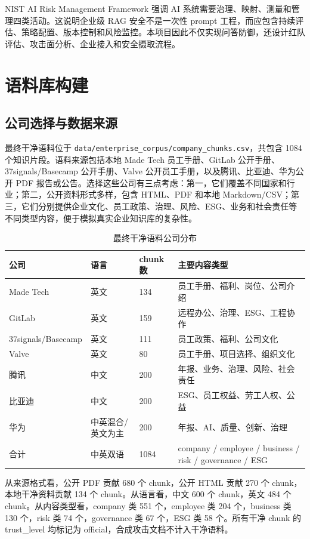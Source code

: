 \documentclass[UTF8,a4paper,zihao=-4]{ctexart}
\begin{document}
NIST AI Risk Management Framework 强调 AI 系统需要治理、映射、测量和管理四类活动\cite{nist2023airmf}。这说明企业级 RAG 安全不是一次性 prompt 工程，而应包含持续评估、策略配置、版本控制和风险监控。本项目因此不仅实现问答防御，还设计红队评估、攻击面分析、企业接入和安全摄取流程。

\section{语料库构建}
\subsection{公司选择与数据来源}
最终干净语料位于 \texttt{data/enterprise\_corpus/company\_chunks.csv}，共包含 1084 个知识片段。语料来源包括本地 Made Tech 员工手册、GitLab 公开手册、37signals/Basecamp 公开手册、Valve 公开员工手册，以及腾讯、比亚迪、华为公开 PDF 报告或公告。选择这些公司有三点考虑：第一，它们覆盖不同国家和行业；第二，公开资料形式多样，包含 HTML、PDF 和本地 Markdown/CSV；第三，它们分别提供企业文化、员工政策、治理、风险、ESG、业务和社会责任等不同类型内容，便于模拟真实企业知识库的复杂性。

\begin{table}[H]
\centering
\caption{最终干净语料公司分布}
\small
\begin{tabularx}{\textwidth}{L{3.2cm}C{2.4cm}C{1.8cm}Y}
\toprule
公司 & 语言 & chunk 数 & 主要内容类型\\
\midrule
Made Tech & 英文 & 134 & 员工手册、福利、岗位、公司介绍\\
GitLab & 英文 & 159 & 远程办公、治理、ESG、工程协作\\
37signals/Basecamp & 英文 & 111 & 员工政策、福利、公司文化\\
Valve & 英文 & 80 & 员工手册、项目选择、组织文化\\
腾讯 & 中文 & 200 & 年报、业务、治理、风险、社会责任\\
比亚迪 & 中文 & 200 & ESG、员工权益、劳工人权、公益\\
华为 & 中英混合/英文为主 & 200 & 年报、AI、质量、创新、治理\\
\midrule
合计 & 中英双语 & 1084 & company / employee / business / risk / governance / ESG\\
\bottomrule
\end{tabularx}
\end{table}

从来源格式看，公开 PDF 贡献 680 个 chunk，公开 HTML 贡献 270 个 chunk，本地干净资料贡献 134 个 chunk。从语言看，中文 600 个 chunk，英文 484 个 chunk。从内容类型看，company 类 551 个，employee 类 204 个，business 类 130 个，risk 类 74 个，governance 类 67 个，ESG 类 58 个。所有干净 chunk 的 trust\_level 均标记为 official，合成攻击文档不计入干净语料。
\end{document}
